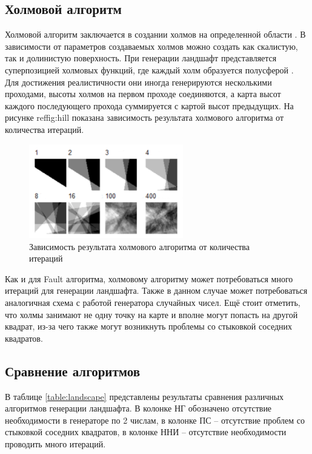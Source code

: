 \subsection{Холмовой алгоритм}

Холмовой алгоритм заключается в создании холмов на определенной области \cite{hill}. В зависимости от параметров создаваемых холмов можно создать как скалистую, так и долинистую поверхность. При генерации ландшафт представляется
суперпозицией холмовых функций, где каждый холм образуется полусферой \cite{hill2}. Для достижения реалистичности они иногда генерируются несколькими проходами, высоты холмов на первом проходе соединяются, а карта высот каждого последующего прохода суммируется с картой высот предыдущих. На рисунке ref{fig:hill} показана зависимость результата холмового алгоритма от количества итераций.

\begin{figure}[h!]
	\centering
	\includegraphics[width=0.6\textwidth]{tex_parts/fault.png}
	\caption{\label{fig:hill}Зависимость результата холмового алгоритма от количества итераций \cite{hill}}
\end{figure}

Как и для Fault алгоритма, холмовому алгоритму может потребоваться много итераций для генерации ландшафта. Также в данном случае может потребоваться аналогичная схема с работой генератора случайных чисел. Ещё стоит отметить, что холмы занимают не одну точку на карте и вполне могут попасть на другой квадрат, из-за чего также могут возникнуть проблемы со стыковкой соседних квадратов. 

\subsection{Сравнение алгоритмов}

В таблице \ref{table:landscape} представлены результаты сравнения различных алгоритмов генерации ландшафта. В колонке НГ обозначено отсутствие необходимости в генераторе по 2 числам, в колонке ПС -- отсутствие проблем со стыковкой соседних квадратов, в колонке ННИ -- отсутствие необходимости проводить много итераций.

